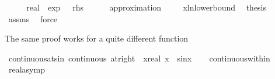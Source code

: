 \begin{isabellebody}
\isamarkupfalse%
\ {\isacharminus}{\kern0pt}\isanewline
\ \ \isamarkupfalse%
\ {\isachardoublequoteopen}{\isacharparenleft}{\kern0pt}{\isacharminus}{\kern0pt}{}{\isacharcolon}{\kern0pt}{\isacharcolon}{\kern0pt}real{\isacharparenright}{\kern0pt}\ {\isacharslash}{\kern0pt}\ exp\ {}\ {\isasymge}\ {\isacharquery}{\kern0pt}rhs{\isachardoublequoteclose}\isanewline
\ \ \ \ \isamarkupfalse%
\ {\isacharparenleft}{\kern0pt}approximation\ {}{}{\isacharparenright}{\kern0pt}\isanewline
\ \ \isamarkupfalse%
\ x{\isacharunderscore}{\kern0pt}ln{\isacharunderscore}{\kern0pt}lowerbound\ \isamarkupfalse%
\ {\isacharquery}{\kern0pt}thesis\isanewline
\ \ \ \ \isamarkupfalse%
\ assms\ \isamarkupfalse%
\ force\isanewline
{}\isamarkupfalse%
%
\endisatagproof
{\isafoldproof}%
%
\isadelimproof
%
\endisadelimproof
%
\begin{isamarkuptext}%
The same proof works for a quite different function%
\end{isamarkuptext}\isamarkuptrue%
\isamarkupfalse%
\ continuous{\isacharunderscore}{\kern0pt}at{\isacharunderscore}{\kern0pt}{}{\isacharunderscore}{\kern0pt}sin{\isacharcolon}{\kern0pt}\ {\isachardoublequoteopen}continuous\ {\isacharparenleft}{\kern0pt}at{\isacharunderscore}{\kern0pt}right\ {}{\isacharparenright}{\kern0pt}\ {\isacharparenleft}{\kern0pt}{\isasymlambda}x{\isacharcolon}{\kern0pt}{\isacharcolon}{\kern0pt}real{\isachardot}{\kern0pt}\ x\ {\isacharasterisk}{\kern0pt}\ sin{\isacharparenleft}{\kern0pt}{}{\isacharslash}{\kern0pt}x{\isacharparenright}{\kern0pt}{\isacharparenright}{\kern0pt}{\isachardoublequoteclose}\isanewline
%
\isadelimproof
\ \ %
\endisadelimproof
%
\isatagproof
{}\isamarkupfalse%
\ continuous{\isacharunderscore}{\kern0pt}within\ \isamarkupfalse%
\ real{\isacharunderscore}{\kern0pt}asymp%
\endisatagproof
{\isafoldproof}%
%
\isadelimproof
\isanewline
%
\endisadelimproof
%
\isadelimtheory
\isanewline
%
\endisadelimtheory
%
\isatagtheory
{}\isamarkupfalse%
%
\endisatagtheory
{\isafoldtheory}%
%
\isadelimtheory
%
\endisadelimtheory
%
\end{isabellebody}%
\endinput
